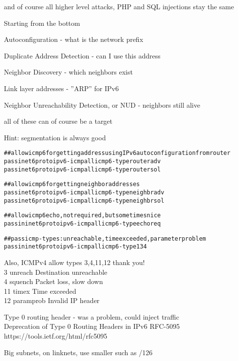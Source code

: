 \documentclass[18pt,landscape,a4paper,footrule]{foils}
\begin{document}
\vskip 1cm
\centerline{and of course all higher level attacks, PHP and SQL injections stay the same}


Starting from the bottom
\begin{list2}
\item Autoconfiguration - what is the network prefix
\item Duplicate Address Detection - can I use this address
\item Neighbor Discovery - which neighbors exist
\item Link layer addresses - ”ARP” for IPv6
\item Neighbor Unreachability Detection, or NUD - neighbors still alive
\end{list2}

\vskip 1cm
\centerline{all of these can of course be a target}

Hint: segmentation is always good


\begin{alltt}\footnotesize
## allow icmp6 for getting address using IPv6 autoconfiguration from router
pass inet6 proto ipv6-icmp all icmp6-type routeradv
pass inet6 proto ipv6-icmp all icmp6-type routersol

## allow icmp6 for getting neighbor addresses
pass inet6 proto ipv6-icmp all icmp6-type neighbradv
pass inet6 proto ipv6-icmp all icmp6-type neighbrsol

## allow icmp6 echo, not required, but sometimes nice
pass in inet6 proto ipv6-icmp all icmp6-type echoreq

## pass icmp-types: unreachable, time exceeded, parameter problem
pass in inet6 proto ipv6-icmp all icmp6-type {1 3 4}
\end{alltt}

{\small
Also, ICMPv4 allow types 3,4,11,12 thank you!\\
3      unreach       Destination unreachable \\
4      squench       Packet loss, slow down\\
11     timex         Time exceeded \\
12     paramprob     Invalid IP header\\
}


\begin{list2}
\item Type 0 routing header - was a problem, could inject traffic\\
Deprecation of Type 0 Routing Headers in IPv6 RFC-5095\\
https://tools.ietf.org/html/rfc5095
\item Big subnets, on linknets, use smaller such as /126
\end{list2}
\end{document}
